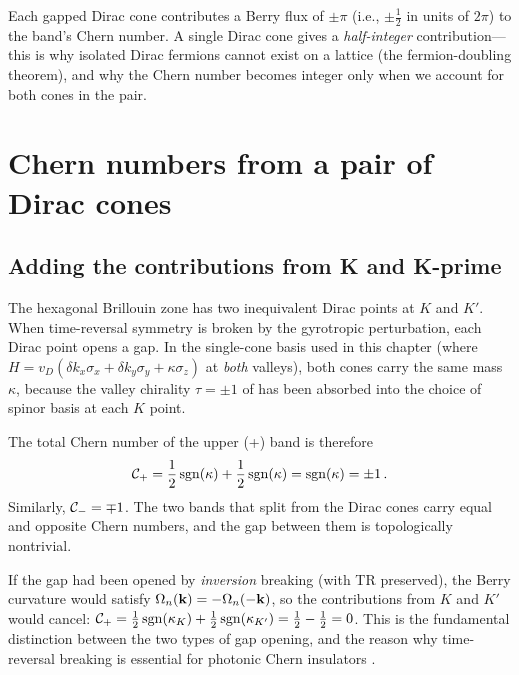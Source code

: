 Each gapped Dirac cone contributes a Berry flux of $\pm\pi$ (i.e.,
$\pm\frac{1}{2}$ in units of $2\pi$) to the band's Chern number.
A single Dirac cone gives a \emph{half-integer} contribution---this is
why isolated Dirac fermions cannot exist on a lattice (the
fermion-doubling theorem), and why the Chern number becomes integer only
when we account for both cones in the pair.

\section{Chern numbers from a pair of Dirac cones}
\label{sec:ch7-chern}

\subsection{Adding the contributions from K and K-prime}
\label{sec:ch7-KKprime}

The hexagonal Brillouin zone has two inequivalent Dirac points at $K$
and $K'$.  When time-reversal symmetry is broken by the gyrotropic
perturbation, each Dirac point opens a gap.  In the single-cone
basis used in this chapter (where
$H=v_D(\delta k_x\sigma_x+\delta k_y\sigma_y+\kappa\sigma_z)$
at \emph{both} valleys), both cones carry the same mass~$\kappa$,
because the valley chirality $\tau=\pm 1$ of 
has been absorbed into the choice of spinor basis at each $K$ point.

The total Chern number of the upper (+) band is therefore
\begin{equation}\label{eq:ch7-chern-total}
  \mathcal{C}_+ = \frac{1}{2}\operatorname{sgn}(\kappa) + \frac{1}{2}\operatorname{sgn}(\kappa)
  = \operatorname{sgn}(\kappa) = \pm 1\,.
\end{equation}
Similarly, $\mathcal{C}_-=\mp 1$.  The two bands that split from the Dirac
cones carry equal and opposite Chern numbers, and the gap between them
is topologically nontrivial.

\begin{remark}
If the gap had been opened by \emph{inversion} breaking (with TR
preserved), the Berry curvature would satisfy
$\Omega_n(\mathbf{k})=-\Omega_n(-\mathbf{k})$, so the contributions from $K$ and
$K'$ would cancel:
$\mathcal{C}_+=\frac{1}{2}\operatorname{sgn}(\kappa_K)+\frac{1}{2}\operatorname{sgn}(\kappa_{K'})
=\frac{1}{2}-\frac{1}{2}=0$.
This is the fundamental distinction between the two types of gap
opening, and the reason why time-reversal breaking is essential for
photonic Chern insulators \cite{nittis2020equivalence}.
\end{remark}

